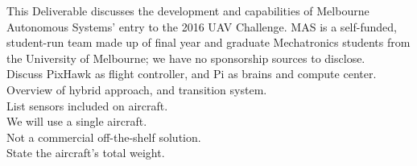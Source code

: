 This Deliverable discusses the development and capabilities of Melbourne Autonomous Systems' entry to the 2016 UAV Challenge. MAS is a self-funded, student-run team made up of final year and graduate Mechatronics students from the University of Melbourne; we have no sponsorship sources to disclose.\\

Discuss PixHawk as flight controller, and Pi as brains and compute center.\\

Overview of hybrid approach, and transition system.\\

List sensors included on aircraft.\\

We will use a single aircraft.\\

Not a commercial off-the-shelf solution.\\

State the aircraft's total weight.\\